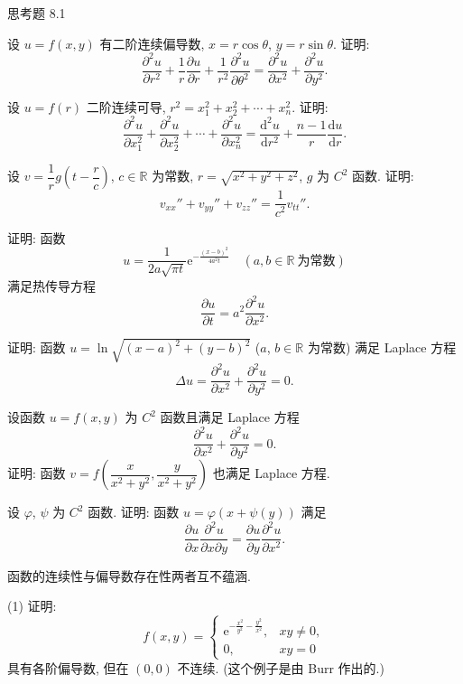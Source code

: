 \begin{exblock}{思考题 8.1}
  \item 设 $u = f(x, y)$ 有二阶连续偏导数, $x = r\cos\theta$, $y = r\sin\theta$. 证明:
  \[
    \frac{\partial^{2}u}{\partial r^{2}} + \frac{1}{r}\frac{\partial u}{\partial r} + \frac{1}{r^{2}}\frac{\partial^{2}u}{\partial \theta^{2}} = \frac{\partial^{2}u}{\partial x^{2}} + \frac{\partial^{2}u}{\partial y^{2}}.
  \]

  \item 设 $u = f(r)$ 二阶连续可导, $r^{2} = x_{1}^{2} + x_{2}^{2} + \cdots + x_{n}^{2}$. 证明:
  \[
    \frac{\partial^{2}u}{\partial x_{1}^{2}} + \frac{\partial^{2}u}{\partial x_{2}^{2}} + \cdots + \frac{\partial^{2}u}{\partial x_{n}^{2}} = \frac{\mathrm{d}^{2}u}{\mathrm{d}r^{2}} + \frac{n - 1}{r}\frac{\mathrm{d}u}{\mathrm{d}r}.
  \]

  \item 设 $v = \dfrac{1}{r}g\left(t - \dfrac{r}{c}\right)$, $c \in \mathbb{R}$ 为常数, $r = \sqrt{x^{2} + y^{2} + z^{2}}$, $g$ 为 $C^{2}$ 函数. 证明:
  \[
    v_{xx}'' + v_{yy}'' + v_{zz}'' = \frac{1}{c^{2}}v_{tt}''.
  \]

  \item 证明: 函数
  \[
    u = \frac{1}{2a\sqrt{\pi t}}\mathrm{e}^{-\frac{(x - b)^{2}}{4a^{2}t}} \quad (a, b \in \mathbb{R}\ \text{为常数})
  \]
  满足热传导方程
  \[
    \frac{\partial u}{\partial t} = a^{2}\frac{\partial^{2}u}{\partial x^{2}}.
  \]

  \item 证明: 函数 $u = \ln\sqrt{(x - a)^{2} + (y - b)^{2}}$ ($a$, $b \in \mathbb{R}$ 为常数) 满足 Laplace 方程
  \[
    \Delta u = \frac{\partial^{2}u}{\partial x^{2}} + \frac{\partial^{2}u}{\partial y^{2}} = 0.
  \]

  \item 设函数 $u = f(x, y)$ 为 $C^{2}$ 函数且满足 Laplace 方程
  \[
    \frac{\partial^{2}u}{\partial x^{2}} + \frac{\partial^{2}u}{\partial y^{2}} = 0.
  \]
  证明: 函数 $v = f\left(\dfrac{x}{x^{2} + y^{2}}, \dfrac{y}{x^{2} + y^{2}}\right)$ 也满足 Laplace 方程.

  \item 设 $\varphi$, $\psi$ 为 $C^{2}$ 函数. 证明: 函数 $u = \varphi(x + \psi(y))$ 满足
  \[
    \frac{\partial u}{\partial x}\frac{\partial^{2}u}{\partial x\partial y} = \frac{\partial u}{\partial y}\frac{\partial^{2}u}{\partial x^{2}}.
  \]

  \item 函数的连续性与偏导数存在性两者互不蕴涵.

  (1) 证明:
  \[
    f(x, y) = \begin{cases}
      \mathrm{e}^{-\frac{x^{2}}{y^{2}} - \frac{y^{2}}{x^{2}}}, & xy \neq 0, \\
      0, & xy = 0
    \end{cases}
  \]
  具有各阶偏导数, 但在 $(0, 0)$ 不连续. (这个例子是由 Burr 作出的.)


\end{exblock}
